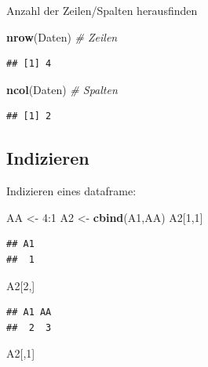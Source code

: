 \documentclass[]{article}
\newenvironment{Shaded}{\begin{snugshade}}{\end{snugshade}}
\newcommand{\KeywordTok}[1]{\textcolor[rgb]{0.13,0.29,0.53}{\textbf{{#1}}}}
\newcommand{\DecValTok}[1]{\textcolor[rgb]{0.00,0.00,0.81}{{#1}}}
\newcommand{\StringTok}[1]{\textcolor[rgb]{0.31,0.60,0.02}{{#1}}}
\newcommand{\CommentTok}[1]{\textcolor[rgb]{0.56,0.35,0.01}{\textit{{#1}}}}
\newcommand{\NormalTok}[1]{{#1}}
\begin{document}
Anzahl der Zeilen/Spalten herausfinden

\begin{Shaded}
\begin{Highlighting}[]
\KeywordTok{nrow}\NormalTok{(Daten) }\CommentTok{# Zeilen}
\end{Highlighting}
\end{Shaded}

\begin{verbatim}
## [1] 4
\end{verbatim}

\begin{Shaded}
\begin{Highlighting}[]
\KeywordTok{ncol}\NormalTok{(Daten) }\CommentTok{# Spalten}
\end{Highlighting}
\end{Shaded}

\begin{verbatim}
## [1] 2
\end{verbatim}

\subsection{Indizieren}\label{indizieren}

Indizieren eines dataframe:

\begin{Shaded}
\begin{Highlighting}[]
\NormalTok{AA <-}\StringTok{ }\DecValTok{4}\NormalTok{:}\DecValTok{1}
\NormalTok{A2 <-}\StringTok{ }\KeywordTok{cbind}\NormalTok{(A1,AA)}
\NormalTok{A2[}\DecValTok{1}\NormalTok{,}\DecValTok{1}\NormalTok{]}
\end{Highlighting}
\end{Shaded}

\begin{verbatim}
## A1 
##  1
\end{verbatim}

\begin{Shaded}
\begin{Highlighting}[]
\NormalTok{A2[}\DecValTok{2}\NormalTok{,]}
\end{Highlighting}
\end{Shaded}

\begin{verbatim}
## A1 AA 
##  2  3
\end{verbatim}

\begin{Shaded}
\begin{Highlighting}[]
\NormalTok{A2[,}\DecValTok{1}\NormalTok{]}
\end{Highlighting}
\end{Shaded}
\end{document}
